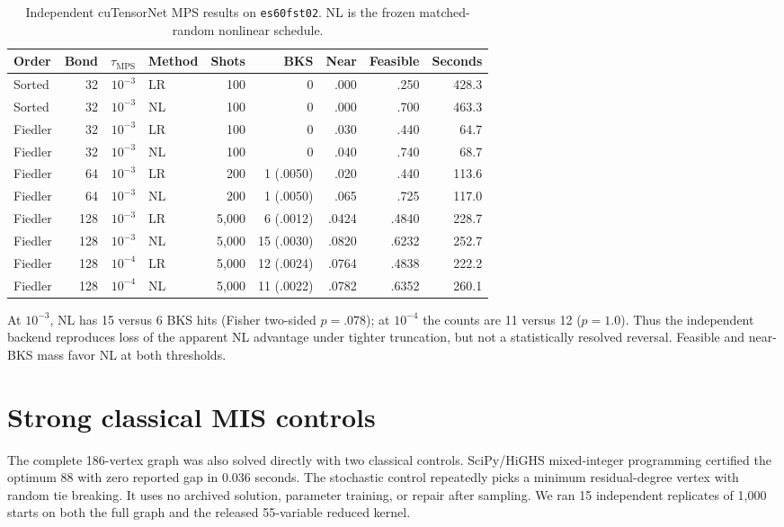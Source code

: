 \documentclass[10pt]{article}
\newcommand{\tauMPS}{\tau_{\mathrm{MPS}}}
\begin{document}
\begin{table}[h]
\centering
\caption{Independent cuTensorNet MPS results on \texttt{es60fst02}. NL is the
frozen matched-random nonlinear schedule.}
\label{tab:cutn}
\small
\begin{tabular}{lrrlrrrrr}
\toprule
Order & Bond & $\tauMPS$ & Method & Shots & BKS & Near & Feasible & Seconds \\
\midrule
Sorted & 32 & $10^{-3}$ & LR & 100 & 0 & .000 & .250 & 428.3 \\
Sorted & 32 & $10^{-3}$ & NL & 100 & 0 & .000 & .700 & 463.3 \\
Fiedler & 32 & $10^{-3}$ & LR & 100 & 0 & .030 & .440 & 64.7 \\
Fiedler & 32 & $10^{-3}$ & NL & 100 & 0 & .040 & .740 & 68.7 \\
Fiedler & 64 & $10^{-3}$ & LR & 200 & 1 (.0050) & .020 & .440 & 113.6 \\
Fiedler & 64 & $10^{-3}$ & NL & 200 & 1 (.0050) & .065 & .725 & 117.0 \\
Fiedler & 128 & $10^{-3}$ & LR & 5,000 & 6 (.0012) & .0424 & .4840 & 228.7 \\
Fiedler & 128 & $10^{-3}$ & NL & 5,000 & 15 (.0030) & .0820 & .6232 & 252.7 \\
Fiedler & 128 & $10^{-4}$ & LR & 5,000 & 12 (.0024) & .0764 & .4838 & 222.2 \\
Fiedler & 128 & $10^{-4}$ & NL & 5,000 & 11 (.0022) & .0782 & .6352 & 260.1 \\
\bottomrule
\end{tabular}
\end{table}

At $10^{-3}$, NL has 15 versus 6 BKS hits (Fisher two-sided $p=.078$);
at $10^{-4}$ the counts are 11 versus 12 ($p=1.0$).  Thus the independent
backend reproduces loss of the apparent NL advantage under tighter
truncation, but not a statistically resolved reversal.  Feasible and near-BKS
mass favor NL at both thresholds.

\section{Strong classical MIS controls}

The complete 186-vertex graph was also solved directly with two classical
controls.  SciPy/HiGHS mixed-integer programming certified the optimum 88 with
zero reported gap in 0.036 seconds.  The stochastic control repeatedly picks
a minimum residual-degree vertex with random tie breaking.  It uses no
archived solution, parameter training, or repair after sampling.  We ran 15
independent replicates of 1,000 starts on both the full graph and the released
55-variable reduced kernel.
\end{document}
